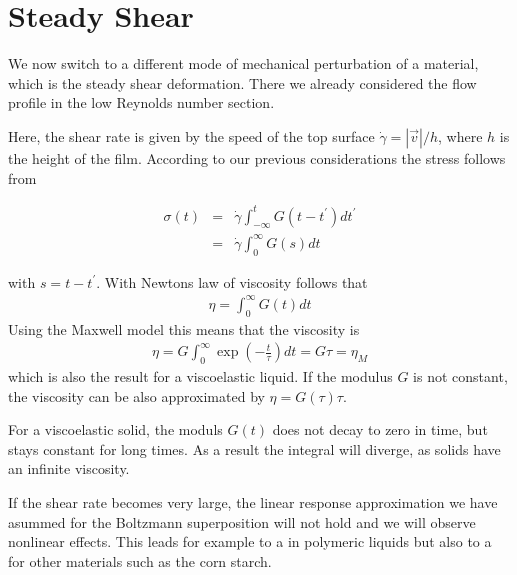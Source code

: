 \documentclass[letterpaper,10pt,english]{sphinxmanual}
\let\sphinxpxdimen\pdfpxdimen\else\newdimen\sphinxpxdimen
\begin{document}
\section{Steady Shear}
\label{\detokenize{notebooks/L24/1_Viscoelasticity:Steady-Shear}}
\sphinxAtStartPar
We now switch to a different mode of mechanical perturbation of a material, which is the steady shear deformation. There we already considered the flow profile in the low Reynolds number section.

\noindent\sphinxincludegraphics[width=400\sphinxpxdimen,height=259\sphinxpxdimen]{{shear}.png}

\sphinxAtStartPar
Here, the shear rate is given by the speed of the top surface \(\dot{\gamma}=|\vec{v}|/h\), where \(h\) is the height of the film. According to our previous considerations the stress follows from

\sphinxAtStartPar
\begin{eqnarray}
\sigma(t)&=&\dot{\gamma}\int_{-\infty}^{t}G(t-t^{\prime})dt^{\prime}\\
&=& \dot{\gamma}\int_0^{\infty}G(s)dt
\end{eqnarray}

\sphinxAtStartPar
with \(s=t-t^{\prime}\). With Newtons law of viscosity follows that
\begin{equation*}
\begin{split}\eta=\int_{0}^{\infty}G(t)dt\end{split}
\end{equation*}
\sphinxAtStartPar
Using the Maxwell model this means that the viscosity is
\begin{equation*}
\begin{split}\eta=G\int_{0}^{\infty}\exp\left (-\frac{t}{\tau}\right )dt=G\tau=\eta_M\end{split}
\end{equation*}
\sphinxAtStartPar
which is also the result for a viscoelastic liquid. If the modulus \(G\) is not constant, the viscosity can be also approximated by \(\eta=G(\tau)\tau\).

\sphinxAtStartPar
For a viscoelastic solid, the moduls \(G(t)\) does not decay to zero in time, but stays constant for long times. As a result the integral will diverge, as solids have an infinite viscosity.

\sphinxAtStartPar
If the shear rate becomes very large, the linear response approximation we have asummed for the Boltzmann superposition will not hold and we will observe non\sphinxhyphen{}linear effects. This leads for example to a  in polymeric liquids but also to a  for other materials such as the corn starch.
\end{document}
